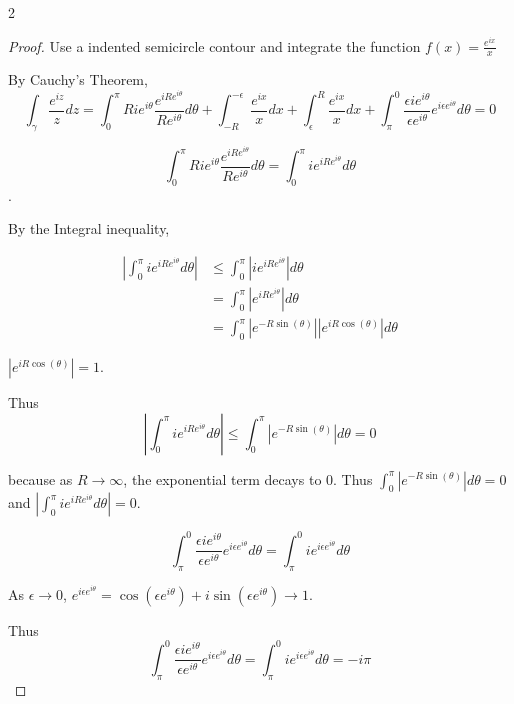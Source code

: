 \documentclass{article}
\newcommand{\abs}[1]{\left\lvert #1\right\rvert}
\begin{document}
\begin{PROB}{2}\label{Problem 2.}
    
\end{PROB}
\begin{proof}
    Use a indented semicircle contour and integrate the function $f(x) = \frac{e^{ix}}{x}$

    By Cauchy's Theorem, 
    \[
        \int_{\gamma} \frac{e^{iz}}{z} dz = \int_{0}^\pi Rie^{i \theta} \frac{e^{iRe^{i \theta}}}{Re^{i \theta}} d \theta + \int_{-R}^{-\epsilon} \frac{e^{ix}}{x} dx + \int_{\epsilon}^{R} \frac{e^{ix}}{x} dx + \int_{\pi}^{0} \frac{\epsilon i e^{i \theta}}{\epsilon e^{i \theta}} e^{i \epsilon e^{i \theta}} d \theta = 0 
    \]

    \[
        \int_{0}^\pi Rie^{i \theta} \frac{e^{iRe^{i \theta}}}{Re^{i \theta}} d \theta = \int_{0}^\pi i e^{iRe^{i \theta}} d \theta
    \].

    By the Integral inequality, 

    \begin{align*}
        \abs{\int_{0}^\pi i e^{iRe^{i \theta}} d \theta} &\leq \int_{0}^\pi \abs{i e^{iRe^{i \theta}}} d \theta \\
        &= \int_{0}^\pi \abs{e^{iRe^{i \theta}}} d \theta \\
        &= \int_{0}^\pi \abs{e^{-R \sin(\theta)}} \abs{e^{iR \cos(\theta)}} d \theta
    \end{align*}

    $\abs{e^{iR \cos(\theta)}} = 1$.
    
    Thus \[
        \abs{\int_{0}^\pi i e^{iRe^{i \theta}} d \theta} \leq \int_{0}^\pi \abs{e^{-R \sin(\theta)}} d \theta = 0
    \]

    because as $R \to \infty$, the exponential term decays to 0. Thus $\int_{0}^\pi \abs{e^{-R \sin(\theta)}} d \theta = 0$ and $\abs{\int_{0}^\pi i e^{iRe^{i \theta}} d \theta} = 0$. 
    
    \[
        \int_{\pi}^{0} \frac{\epsilon i e^{i \theta}}{\epsilon e^{i \theta}} e^{i \epsilon e^{i \theta}} d \theta = \int_{\pi}^{0} i e^{i \epsilon e^{i \theta}} d \theta 
    \]

    As $\epsilon \to 0$, $e^{i \epsilon e^{i \theta}} = \cos(\epsilon e^{i \theta}) + i \sin(\epsilon e^{i \theta}) \to 1$.
    
    Thus \[
        \int_{\pi}^{0} \frac{\epsilon i e^{i \theta}}{\epsilon e^{i \theta}} e^{i \epsilon e^{i \theta}} d \theta = \int_{\pi}^{0} i e^{i \epsilon e^{i \theta}} d \theta = - i \pi
    \]


\end{proof}
\end{document}
